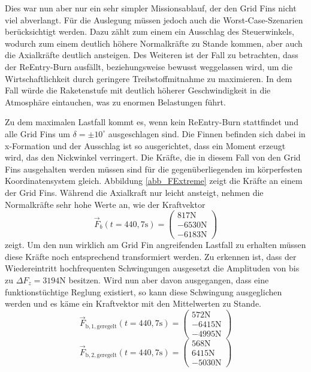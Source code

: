 Dies war nun aber nur ein sehr simpler Missionsablauf, der den Grid Fins nicht viel abverlangt. Für die Auslegung müssen jedoch auch die Worst-Case-Szenarien berücksichtigt werden. Dazu zählt zum einem ein Ausschlag des Steuerwinkels, wodurch zum einem deutlich höhere Normalkräfte zu Stande kommen, aber auch die Axialkräfte deutlich ansteigen. Des Weiteren ist der Fall zu betrachten, dass der ReEntry-Burn ausfällt, beziehungsweise bewusst weggelassen wird, um die Wirtschaftlichkeit durch geringere Treibstoffmitnahme zu maximieren. In dem Fall würde die Raketenstufe mit deutlich höherer Geschwindigkeit in die Atmosphäre eintauchen, was zu enormen Belastungen führt.

Zu dem maximalen Lastfall kommt es, wenn kein ReEntry-Burn stattfindet und alle Grid Fins um $\delta = \pm 10^\circ$ ausgeschlagen sind. Die Finnen befinden sich dabei in x-Formation und der Ausschlag ist so ausgerichtet, dass ein Moment erzeugt wird, das den Nickwinkel verringert. Die Kräfte, die in diesem Fall von den Grid Fins ausgehalten werden müssen sind für die gegenüberliegenden im körperfesten Koordinatensystem gleich. Abbildung \ref{abb_FExtreme} zeigt die Kräfte an einem der Grid Fins. Während die Axialkraft nur leicht ansteigt, nehmen die Normalkräfte sehr hohe Werte an, wie der Kraftvektor
\begin{equation}
	\vec{F}_b(t=440,7\mathrm{s})
	=\left(\begin{array}{c}817\mathrm{N}\\-6530\mathrm{N}\\-6183\mathrm{N}\end{array}\right)
\end{equation}
zeigt. Um den nun wirklich am Grid Fin angreifenden Lastfall zu erhalten müssen diese Kräfte noch entsprechend transformiert werden. Zu erkennen ist, dass der Wiedereintritt hochfrequenten Schwingungen ausgesetzt die Amplituden von bis zu $\Delta F_z = 3194$N besitzen. Wird nun aber davon ausgegangen, dass eine funktionstüchtige Reglung existiert, so kann diese Schwingung ausgeglichen werden und es käme ein Kraftvektor mit den Mittelwerten zu Stande.
\begin{equation}\label{eq_Fmax}
\vec{F}_\mathrm{b, 1, geregelt}(t=440,7\mathrm{s})
=\left(\begin{array}{c}572\mathrm{N}\\-6415\mathrm{N}\\-4995\mathrm{N}\end{array}\right)
\end{equation}
\begin{equation}
\vec{F}_\mathrm{b, 2, geregelt}(t=440,7\mathrm{s})
=\left(\begin{array}{c}568\mathrm{N}\\6415\mathrm{N}\\-5030\mathrm{N}\end{array}\right)
\end{equation}
